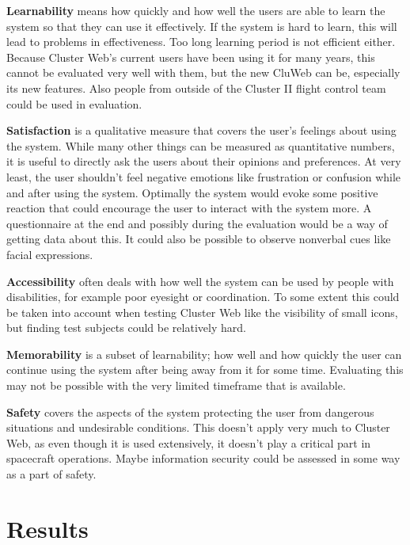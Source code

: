 \textbf{Learnability} means how quickly and how well the users are able to learn the system so that they can use it effectively. If the system is hard to learn, this will lead to problems in effectiveness. Too long learning period is not efficient either. Because Cluster Web's current users have been using it for many years, this cannot be evaluated very well with them, but the new CluWeb can be, especially its new features. Also people from outside of the Cluster II flight control team could be used in evaluation.

\textbf{Satisfaction} is a qualitative measure that covers the user's feelings about using the system. While many other things can be measured as quantitative numbers, it is useful to directly ask the users about their opinions and preferences. At very least, the user shouldn't feel negative emotions like frustration or confusion while and after using the system. Optimally the system would evoke some positive reaction that could encourage the user to interact with the system more. A questionnaire at the end and possibly during the evaluation would be a way of getting data about this. It could also be possible to observe nonverbal cues like facial expressions.

\textbf{Accessibility} often deals with how well the system can be used by people with disabilities, for example poor eyesight or coordination. To some extent this could be taken into account when testing Cluster Web like the visibility of small icons, but finding test subjects could be relatively hard.

\textbf{Memorability} is  a subset of learnability; how well and how quickly the user can continue using the system after being away from it for some time. Evaluating this may not be possible with the very limited timeframe that is available.

\textbf{Safety} covers the aspects of the system protecting the user from dangerous situations and undesirable conditions. This doesn't apply very much to Cluster Web, as even though it is used extensively, it doesn't play a critical part in spacecraft operations. Maybe information security could be assessed in some way as a part of safety.

\cite{rubin2008handbook, bevanevaluation, albert2013measuring}

\cite{bevanevaluation}

\cite{albert2013measuring}



\section{Results}